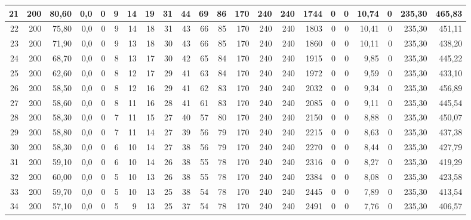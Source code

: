 \begin{appendices}
\begin{table}[H]
{\begin{tabular}{rrrrrrrrrrrrrrrrrrrrrr}
      21 & 200 & 80{,}60 & 0{,}0 & 0  & 9  & 14 & 19 & 31 & 44 & 69  & 86  & 170 & 240 & 240 & 1744 & 0 & 0  & 10{,}74 & 0 & 235{,}30 & 465{,}83 \\ \hline 
      22 & 200 & 75{,}80 & 0{,}0 & 0  & 9  & 14 & 18 & 31 & 43 & 66  & 85  & 170 & 240 & 240 & 1803 & 0 & 0  & 10{,}41 & 0 & 235{,}30 & 451{,}11 \\ \hline
      23 & 200 & 71{,}90 & 0{,}0 & 0  & 9  & 13 & 18 & 30 & 43 & 66  & 85  & 170 & 240 & 240 & 1860 & 0 & 0  & 10{,}11 & 0 & 235{,}30 & 438{,}20 \\ \hline
      24 & 200 & 68{,}70 & 0{,}0 & 0  & 8  & 13 & 17 & 30 & 42 & 65  & 84  & 170 & 240 & 240 & 1915 & 0 & 0  & 9{,}85  & 0 & 235{,}30 & 445{,}22 \\ \hline
      25 & 200 & 62{,}60 & 0{,}0 & 0  & 8  & 12 & 17 & 29 & 41 & 63  & 84  & 170 & 240 & 240 & 1972 & 0 & 0  & 9{,}59  & 0 & 235{,}30 & 433{,}10 \\ \hline
      26 & 200 & 58{,}50 & 0{,}0 & 0  & 8  & 12 & 16 & 29 & 41 & 62  & 83  & 170 & 240 & 240 & 2032 & 0 & 0  & 9{,}34  & 0 & 235{,}30 & 456{,}89 \\ \hline
      27 & 200 & 58{,}60 & 0{,}0 & 0  & 8  & 11 & 16 & 28 & 41 & 61  & 83  & 170 & 240 & 240 & 2085 & 0 & 0  & 9{,}11  & 0 & 235{,}30 & 445{,}54 \\ \hline
      28 & 200 & 58{,}30 & 0{,}0 & 0  & 7  & 11 & 15 & 27 & 40 & 57  & 80  & 170 & 240 & 240 & 2150 & 0 & 0  & 8{,}88  & 0 & 235{,}30 & 450{,}07 \\ \hline
      29 & 200 & 58{,}80 & 0{,}0 & 0  & 7  & 11 & 14 & 27 & 39 & 56  & 79  & 170 & 240 & 240 & 2215 & 0 & 0  & 8{,}63  & 0 & 235{,}30 & 437{,}38 \\ \hline
      30 & 200 & 58{,}30 & 0{,}0 & 0  & 6  & 10 & 14 & 27 & 38 & 56  & 79  & 170 & 240 & 240 & 2270 & 0 & 0  & 8{,}44  & 0 & 235{,}30 & 427{,}79 \\ \hline
      31 & 200 & 59{,}10 & 0{,}0 & 0  & 6  & 10 & 14 & 26 & 38 & 55  & 78  & 170 & 240 & 240 & 2316 & 0 & 0  & 8{,}27  & 0 & 235{,}30 & 419{,}29 \\ \hline
      32 & 200 & 60{,}00 & 0{,}0 & 0  & 5  & 10 & 13 & 26 & 38 & 55  & 78  & 170 & 240 & 240 & 2384 & 0 & 0  & 8{,}08  & 0 & 235{,}30 & 423{,}58 \\ \hline
      33 & 200 & 59{,}70 & 0{,}0 & 0  & 5  & 10 & 13 & 25 & 38 & 54  & 78  & 170 & 240 & 240 & 2445 & 0 & 0  & 7{,}89  & 0 & 235{,}30 & 413{,}54 \\ \hline
      34 & 200 & 57{,}10 & 0{,}0 & 0  & 5  & 9  & 13 & 25 & 37 & 54  & 78  & 170 & 240 & 240 & 2491 & 0 & 0  & 7{,}76  & 0 & 235{,}30 & 406{,}57 \\ \hline

\end{tabular}}
\end{table}
\end{appendices}

